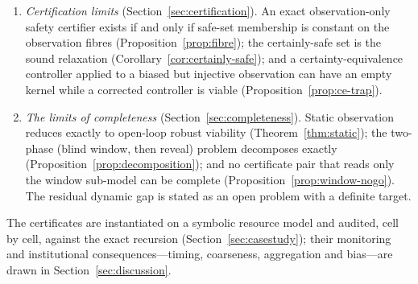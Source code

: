 \begin{enumerate}[leftmargin=2em,itemsep=2pt]
\item \emph{Certification limits} (Section~\ref{sec:certification}). An exact observation-only safety certifier exists if and only if safe-set membership is constant on the observation fibres (Proposition~\ref{prop:fibre}); the certainly-safe set is the sound relaxation (Corollary~\ref{cor:certainly-safe}); and a certainty-equivalence controller applied to a biased but injective observation can have an empty kernel while a corrected controller is viable (Proposition~\ref{prop:ce-trap}).
\item \emph{The limits of completeness} (Section~\ref{sec:completeness}). Static observation reduces exactly to open-loop robust viability (Theorem~\ref{thm:static}); the two-phase (blind window, then reveal) problem decomposes exactly (Proposition~\ref{prop:decomposition}); and no certificate pair that reads only the window sub-model can be complete (Proposition~\ref{prop:window-nogo}). The residual dynamic gap is stated as an open problem with a definite target.
\end{enumerate}
The certificates are instantiated on a symbolic resource model and audited, cell by cell, against the exact recursion (Section~\ref{sec:casestudy}); their monitoring and institutional consequences---timing, coarseness, aggregation and bias---are drawn in Section~\ref{sec:discussion}.

